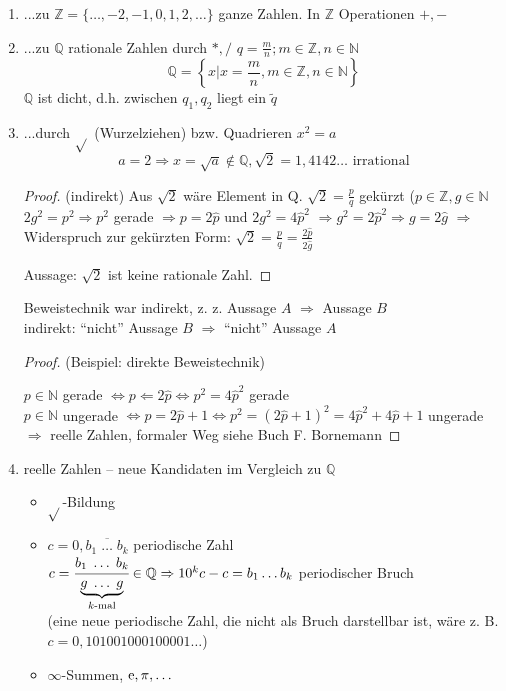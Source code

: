 \begin{enumerate}
 \item ...zu $\mathbb{Z} = \{\ldots,-2,-1,0,1,2,\ldots\}$ ganze Zahlen. In $\mathbb{Z}$ Operationen $+,-$
 \item ...zu $\mathbb{Q}$ rationale Zahlen durch $*,/$ $q=\frac{m}{n}; m \in \mathbb{Z}, n \in \mathbb{N}$
  \begin{equation*}\mathbb{Q} = \left\{x | x=\frac{m}{n}, m \in \mathbb{Z}, n \in \mathbb{N} \right\}\end{equation*}
  $\mathbb{Q}$ ist dicht, d.h. zwischen $q_1, q_2$ liegt ein $\tilde{q}$
 \item ...durch $\sqrt{}$ (Wurzelziehen) bzw. Quadrieren $x^2=a$
 \begin{equation*}a=2 \Rightarrow x = \sqrt{a} \notin \mathbb{Q}, \sqrt{2}=1,4142\ldots\text{ irrational}\end{equation*}

\begin{proof} (indirekt)
Aus $\sqrt{2}$ wäre Element in Q. $\sqrt{2}=\frac{p}{q}$ gekürzt ($p \in \mathbb{Z}, g \in \mathbb{N}$
$2g^2=p^2 \Rightarrow p^2$ gerade $\Rightarrow p=2\hat{p}$ und $2g^2=4\hat{p}^2$
$\Rightarrow g^2 = 2\hat{p}^2 \Rightarrow g=2\hat{g}$ 
$\Rightarrow$ Widerspruch zur gekürzten Form: $\sqrt{2}=\frac{p}{q}=\frac{2\hat{p}}{2\hat{g}}$

Aussage: $\sqrt{2}$ ist keine rationale Zahl.
\end{proof}

Beweistechnik war indirekt, z. z. Aussage $A$ $\Rightarrow$ Aussage $B$\\
indirekt: ``nicht'' Aussage $B$ $\Rightarrow$ ``nicht'' Aussage $A$


\begin{proof} (Beispiel: direkte Beweistechnik)

$p \in \mathbb{N}$ gerade $\Leftrightarrow p \Leftarrow 2 \hat{p} \Leftrightarrow p^2 = 4\hat{p}^2$ gerade\\
$p \in \mathbb{N}$ ungerade $\Leftrightarrow p = 2 \hat{p}+1 \Leftrightarrow p^2 = (2\hat{p}+1)^2=4\hat{p}^2+4\hat{p}+1$ ungerade\\
$\Rightarrow$ reelle Zahlen, formaler Weg siehe Buch F. Bornemann
\end{proof}

 \item reelle Zahlen -- neue Kandidaten im Vergleich zu $\mathbb{Q}$
\begin{itemize}
 \item $\sqrt{}$-Bildung
 \item $c = 0,\overline{b_1 \;\ldots\; b_k}$ periodische Zahl\\
$c = \cfrac{b_1 \;\ldots\; b_k}{\underbrace{g \;\ldots\; g}_{k\text{-mal}}} \in \mathbb{Q} \Rightarrow 10^k c -c = b_1 \ldots b_k$ periodischer Bruch\\
(eine neue periodische Zahl, die nicht als Bruch darstellbar ist, wäre z. B. $c=0,101001000100001\ldots$)
 \item $\infty$-Summen, $\operatorname{e}, \pi,\ldots$
\end{itemize}

\end{enumerate}

